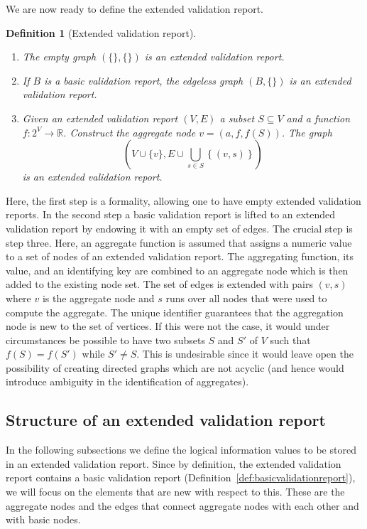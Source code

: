 \documentclass[a4paper, 11pt,titlepage]{article}
\newtheorem{definition}{Definition}
\begin{document}
We are now ready to define the extended validation report.
%
\begin{definition}[Extended validation report]\leavevmode
\label{def:extvalrep}
\begin{enumerate}
\item The empty graph $(\{\},\{\})$ is an extended validation report.
\item If $B$ is a basic validation report, the edgeless graph $(B, \{\})$ is an
extended validation report.
\item Given an extended validation report $(V,E)$  a subset $S\subseteq V$ and
a function $f:2^V\to\mathbb{R}$. Construct the aggregate node $v=(a,f,f(S))$.
The graph
\begin{displaymath}
\left(
V\cup \{v\}, E\cup \bigcup_{s\in S}\left\{( v, s )\right\}
\right)
\end{displaymath}
is an extended validation report.
\end{enumerate}
\end{definition}
Here, the first step is a formality, allowing one to have empty extended
validation reports. In the second step a basic validation report is lifted to
an extended validation report by endowing it with an empty set of edges. The
crucial step is step three. Here, an aggregate function is assumed that assigns
a numeric value to a set of nodes of an extended validation report.  The
aggregating function, its value, and an identifying key are combined to an
aggregate node which is then added to the existing node set. The set of edges
is extended with pairs $(v,s)$ where $v$ is the aggregate node and $s$ runs
over all nodes that were used to compute the aggregate.  The unique identifier
guarantees that the aggregation node is new to the set of vertices. If this
were not the case, it would under circumstances be possible to have two subsets
$S$ and $S'$ of $V$ such that $f(S)=f(S')$ while $S'\not=S$. This is
undesirable since it would leave open the possibility of creating directed
graphs which are not acyclic (and hence would introduce ambiguity in the
identification of aggregates).






\subsection{Structure of an extended validation report}
\label{sect:extendedreport}
In the following subsections we define the logical information values to be
stored in an extended validation report. Since by definition, the extended
validation report contains a basic validation report
(Definition~\ref{def:basicvalidationreport}), we will focus on the elements
that are new with respect to this.  These are the aggregate nodes and the edges
that connect aggregate nodes with each other and with basic nodes. 
\end{document}
